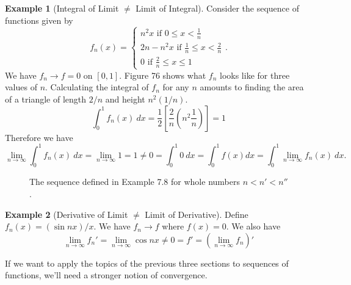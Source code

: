 \documentclass{article}
\newcommand{\R}{\mathbb{R}}
\theoremstyle{definition}
\newtheorem{example}{Example}[section]
\begin{document}
\begin{example}[Integral of Limit $ \neq $ Limit of Integral]
 Consider the sequence of functions given by $$ f_n(x)=\begin{cases}
 n^2x\text{ if } 0\le x<\frac{1}{n}\\
 2n-n^2x\text{ if } \frac{1}{n}\le x <\frac{2}{n}\\
 0\text{ if } \frac{2}{n}\le x\le 1
 \end{cases}.$$ We have $ f_n\to f=0 $ on $ [0,1] $. Figure 76 shows what $ f_n $ looks like for three values of $ n $. Calculating the integral of $ f_n $ for any $ n $ amounts to finding the area of a triangle of length $ 2/n $ and height $ n^2(1/n) $. $$ \int_{0}^1f_n(x)\ dx=\frac{1}{2}\left[\frac{2}{n}\left(n^2\frac{1}{n}\right)\right]=1 $$ Therefore we have $$\lim\limits_{n\to\infty}\int_{0}^{1}f_n(x)\ dx=\lim\limits_{n\to\infty}1=1\neq 0=\int_{0}^{1}0\ dx=\int_{0}^{1} f(x) dx=\int_{0}^{1}\lim\limits_{n\to\infty} f_n(x)\ dx.$$
 \begin{figure}[h!]
	\centering
	\caption{The sequence defined in Example 7.8 for whole numbers $ n<n'<n'' $. }
 \end{figure}
 
\end{example} 
\begin{example}[Derivative of Limit $ \neq $ Limit of Derivative]
Define $ f_n(x)=(\sin nx) / x $. We have $f_n\to f$ where $ f(x)=0 $. We also have $$ \lim\limits_{n\to\infty}f_n'=\lim\limits_{n\to\infty}\cos nx\neq 0=f'=\left(\lim\limits_{n\to\infty}f_n\right)'$$
\end{example}
If we want to apply the topics of the previous three sections to sequences of functions, we'll need a stronger notion of convergence.  
\end{document}
